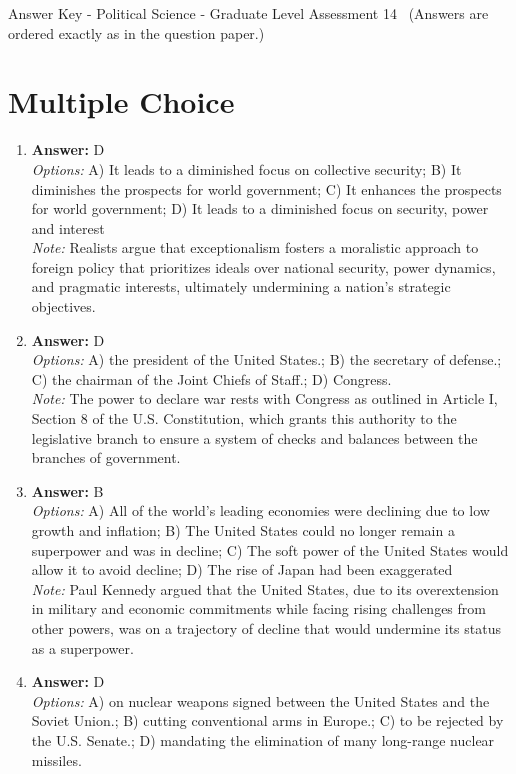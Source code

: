 \documentclass[12pt]{article}
\begin{document}
\begin{center}
Answer Key - Political Science - Graduate Level Assessment 14 \
\small (Answers are ordered exactly as in the question paper.)
\end{center}

\section*{Multiple Choice}
\begin{enumerate}[label=\arabic*.]
\item \textbf{Answer:} D
\\ \textit{Options:} A) It leads to a diminished focus on collective security; B) It diminishes the prospects for world government; C) It enhances the prospects for world government; D) It leads to a diminished focus on security, power and interest
\\ \textit{Note:} Realists argue that exceptionalism fosters a moralistic approach to foreign policy that prioritizes ideals over national security, power dynamics, and pragmatic interests, ultimately undermining a nation's strategic objectives.
\item \textbf{Answer:} D
\\ \textit{Options:} A) the president of the United States.; B) the secretary of defense.; C) the chairman of the Joint Chiefs of Staff.; D) Congress.
\\ \textit{Note:} The power to declare war rests with Congress as outlined in Article I, Section 8 of the U.S. Constitution, which grants this authority to the legislative branch to ensure a system of checks and balances between the branches of government.
\item \textbf{Answer:} B
\\ \textit{Options:} A) All of the world's leading economies were declining due to low growth and inflation; B) The United States could no longer remain a superpower and was in decline; C) The soft power of the United States would allow it to avoid decline; D) The rise of Japan had been exaggerated
\\ \textit{Note:} Paul Kennedy argued that the United States, due to its overextension in military and economic commitments while facing rising challenges from other powers, was on a trajectory of decline that would undermine its status as a superpower.
\item \textbf{Answer:} D
\\ \textit{Options:} A) on nuclear weapons signed between the United States and the Soviet Union.; B) cutting conventional arms in Europe.; C) to be rejected by the U.S. Senate.; D) mandating the elimination of many long-range nuclear missiles.

\end{enumerate}
\end{document}
